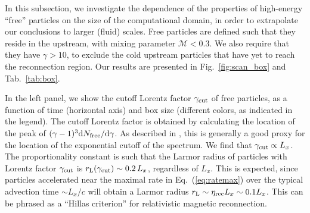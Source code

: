 \documentclass[twocolumn,twocolappendix]{aastex63}
\newcommand{\eq}[1]{Eq.~(\ref{eq:#1})}
\begin{document}
In this subsection, we investigate the dependence of the properties of high-energy ``free'' particles on the size of the computational domain, in order to extrapolate our conclusions to larger (fluid) scales. Free particles are defined such that they reside in the upstream, with mixing parameter $\mathcal{M}<0.3$. We also require that they have $\gamma>10$, to exclude the cold upstream particles that have yet to reach the reconnection region. Our results are presented in Fig.~\ref{fig:scan_box} and Tab.~\ref{tab:box}.




In the left panel, we show the cutoff Lorentz factor $\gamma_{\rm cut}$ of
free particles, as a function of time (horizontal axis) and box size (different colors, as indicated in the legend). The cutoff Lorentz factor is obtained by calculating the location of the peak of $(\gamma-1)^3{\rm d}N_{\rm free}/{\rm d}\gamma$. As described in \citet{petropoulou_18}, this is generally a good proxy for the location of the exponential cutoff of the spectrum. We find that $\gamma_{\rm cut}\propto L_x$. The proportionality constant is such that the Larmor radius of particles with Lorentz factor $\gamma_{\rm cut}$ is $r_{\rm L}(\gamma_{\rm cut})\sim 0.2 \,L_{x}$, regardless of $L_x$. This is expected, since particles accelerated near the maximal rate in \eq{ratemax} over the typical advection time $\sim L_x/c$ will obtain a Larmor radius $r_{\rm L}\sim \eta_{\rm rec}L_x\sim 0.1 L_x$.
This can be phrased as a ``Hillas criterion'' for relativistic magnetic reconnection. 
\end{document}
